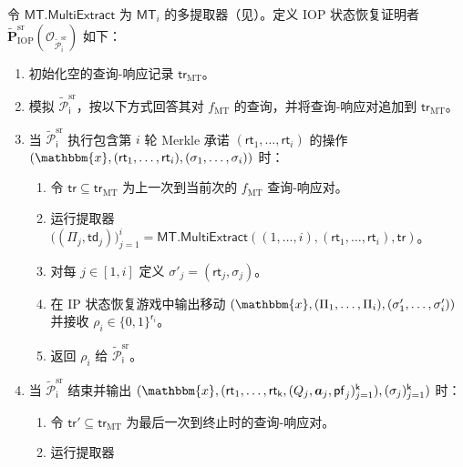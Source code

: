 \documentclass[american,singlepageview]{snargs-book-zh}
\newcommand{\Bits}{\{0,1\}}
\newcommand{\Malicious}[1]{\tilde{#1}}
\renewcommand{\vec}[1]{\bm{#1}}
\newcommand{\BlackBox}[1]{\mathcal{O}_{#1}}
\newcommand{\Instance}{\mathbbm{x}}
\newcommand{\ProtoProver}{P}
\newcommand{\ProtoRoundComplexity}{\mathsf{k}}
\newcommand{\ProtoRandomnessComplexity}{\mathsf{r}}
\newcommand{\RoundIndex}{i}
\newcommand{\SRSuperscript}{\mathrm{sr}}
\newcommand{\IOPSubscript}{\scriptscriptstyle\mathrm{IOP}}
\newcommand{\IOPFormat}[1]{\mathbf{#1}}
\newcommand{\IOPMaliciousProver}{\Malicious{\IOPFormat{\ProtoProver}}_{\IOPSubscript}}
\newcommand{\IOPString}{\Pi}
\newcommand{\IOPEntry}{a}
\newcommand{\IOPEntries}{\vec{\IOPEntry}}
\newcommand{\IOPQuerySet}{Q}
\newcommand{\IOPVerifierRandomMessage}{\rho}
\newcommand{\IOPRoundComplexity}{\ProtoRoundComplexity}
\newcommand{\IOPRandomnessComplexity}{\ProtoRandomnessComplexity}
\newcommand{\ARGFormat}[1]{\mathcal{#1}}
\newcommand{\ARGProver}{\ARGFormat{\ProtoProver}}
\newcommand{\ROFunction}{f}
\newcommand{\ROTrace}{\mathsf{tr}}
\newcommand{\ROTreeTrace}{\ROTrace_{\ROTreeSymbol}}
\newcommand{\ROTreeSymbol}{\MTSubscript}
\newcommand{\ROTreeFunction}{\ROFunction_{\ROTreeSymbol}}
\newcommand{\MTSymbol}{\mathsf{MT}}
\newcommand{\MTSubscript}{{\scriptscriptstyle\mathrm{MT}}}
\newcommand{\MTMultiExtractor}{\MTSymbol.\mathsf{MultiExtract}}
\newcommand{\MTCommitment}{\mathsf{rt}}
\newcommand{\MTTrapdoor}{\mathsf{td}}
\newcommand{\MTProof}{\mathsf{pf}}
\newcommand{\IBCSMaliciousSRProver}{\Malicious{\ARGProver}_{\mathsf{i}}^{\SRSuperscript}}
\newcommand{\SRSaltString}{\sigma}
\newcommand{\IOPMaliciousSRProver}{\IOPMaliciousProver^{\SRSuperscript}}
\begin{document}
\begin{construction}
\label{construction:sr-soundness-of-ibcs}
令 \(\MTMultiExtractor\) 为
\(\MTSymbol_{\RoundIndex}\) 的多提取器（见）。定义 IOP 状态恢复证明者
\(\IOPMaliciousSRProver(\BlackBox{\IBCSMaliciousSRProver})\) 如下：
\begin{enumerate}[noitemsep]
  \item 初始化空的查询-响应记录 \(\ROTreeTrace\)。
  \item 模拟 \(\IBCSMaliciousSRProver\)，按以下方式回答其对 \(\ROTreeFunction\) 的查询，并将查询-响应对追加到 \(\ROTreeTrace\)。
  \item 当 \(\IBCSMaliciousSRProver\) 执行包含第 \(\RoundIndex\) 轮 Merkle 承诺
    \((\MTCommitment_1,\dots,\MTCommitment_{\RoundIndex})\) 的操作
    \((\Instance,(\MTCommitment_1,\dots,\MTCommitment_{\RoundIndex}),(\SRSaltString_1,\dots,\SRSaltString_{\RoundIndex}))\) 时：
  \begin{enumerate}[noitemsep]
    \item 令 \(\ROTrace\subseteq\ROTreeTrace\) 为上一次到当前次的 \(\ROTreeFunction\) 查询-响应对。
    \item 运行提取器
      \(\bigl((\IOPString_j,\MTTrapdoor_j)\bigr)_{j=1}^\RoundIndex
        =\MTMultiExtractor((1,\dots,\RoundIndex),
           (\MTCommitment_1,\dots,\MTCommitment_{\RoundIndex}),\ROTrace)\)。
    \item 对每 \(j\in[1,\RoundIndex]\) 定义
      \(\SRSaltString'_j=(\MTCommitment_j,\SRSaltString_j)\)。
    \item 在 IP 状态恢复游戏中输出移动
      \((\Instance,(\IOPString_1,\dots,\IOPString_{\RoundIndex}),
        (\SRSaltString'_1,\dots,\SRSaltString'_{\RoundIndex}))\) 并接收
      \(\IOPVerifierRandomMessage_{\RoundIndex}\in\Bits^{\IOPRandomnessComplexity_{\RoundIndex}}\)。
    \item 返回 \(\IOPVerifierRandomMessage_{\RoundIndex}\) 给 \(\IBCSMaliciousSRProver\)。
  \end{enumerate}
  \item 当 \(\IBCSMaliciousSRProver\) 结束并输出
    \((\Instance,
      (\MTCommitment_1,\dots,\MTCommitment_{\IOPRoundComplexity},
       (\IOPQuerySet_j,\IOPEntries_j,\MTProof_j)_{j=1}^{\IOPRoundComplexity}),
      (\SRSaltString_j)_{j=1}^{\IOPRoundComplexity})\) 时：
  \begin{enumerate}[noitemsep]
    \item 令 \(\ROTrace'\subseteq\ROTreeTrace\) 为最后一次到终止时的查询-响应对。
    \item 运行提取器

\end{enumerate}
\end{enumerate}
\end{construction}
\end{document}
